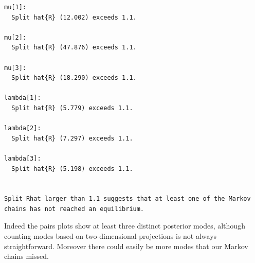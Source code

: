 \documentclass[
  letterpaper,
  DIV=11,
  numbers=noendperiod]{scrartcl}
\newenvironment{Shaded}{\begin{snugshade}}{\end{snugshade}}
\newcommand{\AttributeTok}[1]{\textcolor[rgb]{0.40,0.45,0.13}{#1}}
\newcommand{\ConstantTok}[1]{\textcolor[rgb]{0.56,0.35,0.01}{#1}}
\newcommand{\ControlFlowTok}[1]{\textcolor[rgb]{0.00,0.23,0.31}{#1}}
\newcommand{\DecValTok}[1]{\textcolor[rgb]{0.68,0.00,0.00}{#1}}
\newcommand{\FunctionTok}[1]{\textcolor[rgb]{0.28,0.35,0.67}{#1}}
\newcommand{\NormalTok}[1]{\textcolor[rgb]{0.00,0.23,0.31}{#1}}
\newcommand{\OtherTok}[1]{\textcolor[rgb]{0.00,0.23,0.31}{#1}}
\newcommand{\SpecialCharTok}[1]{\textcolor[rgb]{0.37,0.37,0.37}{#1}}
\newcommand{\StringTok}[1]{\textcolor[rgb]{0.13,0.47,0.30}{#1}}
\begin{document}
\begin{Shaded}
\end{Shaded}

\begin{verbatim}
mu[1]:
  Split hat{R} (12.002) exceeds 1.1.

mu[2]:
  Split hat{R} (47.876) exceeds 1.1.

mu[3]:
  Split hat{R} (18.290) exceeds 1.1.

lambda[1]:
  Split hat{R} (5.779) exceeds 1.1.

lambda[2]:
  Split hat{R} (7.297) exceeds 1.1.

lambda[3]:
  Split hat{R} (5.198) exceeds 1.1.


Split Rhat larger than 1.1 suggests that at least one of the Markov
chains has not reached an equilibrium.
\end{verbatim}

Indeed the pairs plots show at least three distinct posterior modes,
although counting modes based on two-dimensional projections is not
always straightforward. Moreover there could easily be more modes that
our Markov chains missed.

\begin{Shaded}
\end{Shaded}
\end{document}
